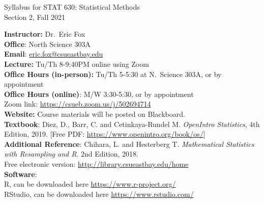 \documentclass[12pt]{report}
\begin{document}
\setlength\parindent{0pt}

\begin{center}
\Large
Syllabus for STAT 630: Statistical Methods\\
\large
Section 2, Fall 2021\\   
\end{center}
\vspace{5pt}

\normalsize
\textbf{Instructor:} Dr.~Eric Fox\\ 
\textbf{Office}: North Science 303A\\ 
\textbf{Email}: \url{eric.fox@csueastbay.edu}\\

\textbf{Lecture:} Tu/Th 8-9:40PM online using Zoom\\

\textbf{Office Hours (in-person):} Tu/Th 5-5:30 at N.~Science 303A, or by appointment\\

\textbf{Office Hours (online)}: M/W 3:30-5:30, or by appointment\\
Zoom link: \url{https://csueb.zoom.us/j/502694714}\\

\textbf{Website:} Course materials will be posted on Blackboard.\\ 

\textbf{Textbook}:  Diez, D., Barr, C. and Cetinkaya-Rundel M. \emph{OpenIntro Statistics}, 4th Edition, 2019. [Free PDF: \url{https://www.openintro.org/book/os/}]\\ 

\textbf{Additional Reference}: Chihara, L. and Hesterberg T. \emph{Mathematical Statistics with Resampling and R}. 2nd Edition, 2018.\\ 
Free electronic version: \url{http://library.csueastbay.edu/home}\\

\textbf{Software}:\\ 
R, can be downloaded here \url{https://www.r-project.org/}\\
RStudio, can be downloaded here \url{https://www.rstudio.com/}\\ 
\end{document}

